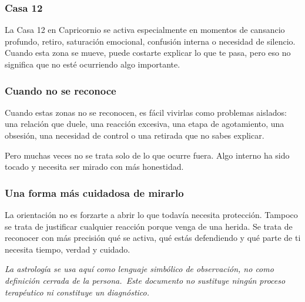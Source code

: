 \documentclass[11pt,a4paper]{article}
\begin{document}
\subsubsection*{Casa 12}
La Casa 12 en Capricornio se activa especialmente en momentos de cansancio profundo, retiro, saturación emocional, confusión interna o necesidad de silencio. Cuando esta zona se mueve, puede costarte explicar lo que te pasa, pero eso no significa que no esté ocurriendo algo importante.

\subsubsection*{Cuando no se reconoce}
Cuando estas zonas no se reconocen, es fácil vivirlas como problemas aislados: una relación que duele, una reacción excesiva, una etapa de agotamiento, una obsesión, una necesidad de control o una retirada que no sabes explicar.

Pero muchas veces no se trata solo de lo que ocurre fuera. Algo interno ha sido tocado y necesita ser mirado con más honestidad.

\subsubsection*{Una forma más cuidadosa de mirarlo}
La orientación no es forzarte a abrir lo que todavía necesita protección. Tampoco se trata de justificar cualquier reacción porque venga de una herida. Se trata de reconocer con más precisión qué se activa, qué estás defendiendo y qué parte de ti necesita tiempo, verdad y cuidado.

\vspace{1cm}
\begin{center}
{\small\itshape\color{grisai}
La astrología se usa aquí como lenguaje simbólico de observación, no como definición cerrada de la persona.\
Este documento no sustituye ningún proceso terapéutico ni constituye un diagnóstico.
}
\end{center}
\end{document}
